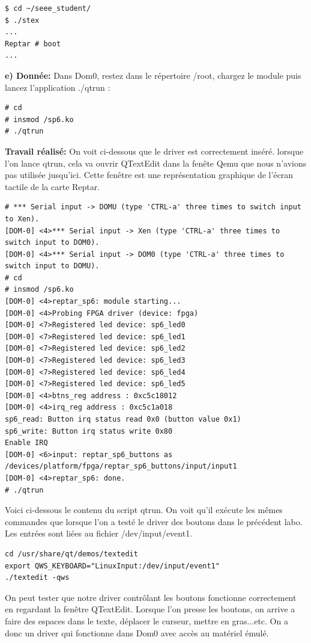 \begin{lstlisting}
$ cd ~/seee_student/
$ ./stex
...
Reptar # boot
...
\end{lstlisting}
\textbf{e) Donnée: }Dans Dom0, restez dans le répertoire /root, chargez le module puis lancez l'application ./qtrun :
\begin{lstlisting}
# cd
# insmod /sp6.ko
# ./qtrun
\end{lstlisting}
\textbf{Travail réalisé: }On voit ci-dessous que le driver est correctement inséré. lorsque l'on lance qtrun, cela va ouvrir QTextEdit dans la fenête Qemu que nous n'avions pas utilisée jusqu'ici. Cette fenêtre est une représentation graphique de l'écran tactile de la carte Reptar.
\begin{lstlisting}
# *** Serial input -> DOMU (type 'CTRL-a' three times to switch input to Xen).
[DOM-0] <4>*** Serial input -> Xen (type 'CTRL-a' three times to switch input to DOM0).
[DOM-0] <4>*** Serial input -> DOM0 (type 'CTRL-a' three times to switch input to DOMU).
# cd
# insmod /sp6.ko 
[DOM-0] <4>reptar_sp6: module starting...
[DOM-0] <4>Probing FPGA driver (device: fpga)
[DOM-0] <7>Registered led device: sp6_led0
[DOM-0] <7>Registered led device: sp6_led1
[DOM-0] <7>Registered led device: sp6_led2
[DOM-0] <7>Registered led device: sp6_led3
[DOM-0] <7>Registered led device: sp6_led4
[DOM-0] <7>Registered led device: sp6_led5
[DOM-0] <4>btns_reg address : 0xc5c18012
[DOM-0] <4>irq_reg address : 0xc5c1a018
sp6_read: Button irq status read 0x0 (button value 0x1)
sp6_write: Button irq status write 0x80
Enable IRQ
[DOM-0] <6>input: reptar_sp6_buttons as /devices/platform/fpga/reptar_sp6_buttons/input/input1
[DOM-0] <4>reptar_sp6: done.
# ./qtrun
\end{lstlisting}
Voici ci-dessous le contenu du script qtrun. On voit qu'il exécute les mêmes commandes que lorsque l'on a testé le driver des boutons dans le précédent labo. Les entrées sont liées au fichier /dev/input/event1.
\begin{lstlisting}
cd /usr/share/qt/demos/textedit
export QWS_KEYBOARD="LinuxInput:/dev/input/event1"
./textedit -qws
\end{lstlisting}
On peut tester que notre driver contrôlant les boutons fonctionne correctement en regardant la fenêtre QTextEdit. Lorsque l'on presse les boutons, on arrive a faire des espaces dans le texte, déplacer le curseur, mettre en gras...etc. On a donc un driver qui fonctionne dans Dom0 avec accès au matériel émulé.
